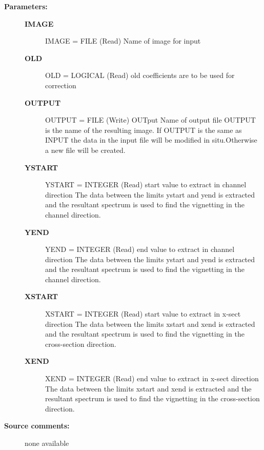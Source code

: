 \begin{description}
\item [\textbf{Parameters:}]
\begin{description}
\item [\textbf{IMAGE}]
    IMAGE = FILE (Read)
        Name of image for input
\item [\textbf{OLD}]
    OLD = LOGICAL (Read)
        old coefficients are to be used for correction
\item [\textbf{OUTPUT}]
    OUTPUT = FILE (Write)
        OUTput Name of output file
            OUTPUT is the name of the resulting image. If OUTPUT is the
            same as INPUT the data in the input file will be modified in
            situ.Otherwise a new file will be created.
\item [\textbf{YSTART}]
    YSTART = INTEGER (Read)
        start value to extract in channel direction
            The data between the limits ystart and yend is extracted
            and the resultant spectrum is used to find the vignetting in
            the channel direction.
\item [\textbf{YEND}]
    YEND = INTEGER (Read)
        end value to extract in channel direction
            The data between the limits ystart and yend is extracted
            and the resultant spectrum is used to find the vignetting in
            the channel direction.
\item [\textbf{XSTART}]
    XSTART = INTEGER (Read)
        start value to extract in x-sect direction
            The data between the limits xstart and xend is extracted
            and the resultant spectrum is used to find the vignetting in
            the cross-section direction.
\item [\textbf{XEND}]
    XEND = INTEGER (Read)
        end value to extract in x-sect direction
            The data between the limits xstart and xend is extracted
            and the resultant spectrum is used to find the vignetting in
            the cross-section direction.
\end{description}

\item [\textbf{Source comments:}]
\begin{terminalv}
  none available

\end{terminalv}
\end{description}
